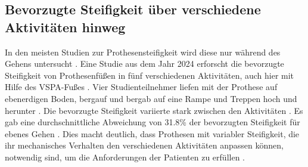 \subsection{Bevorzugte Steifigkeit über verschiedene Aktivitäten hinweg}
In den meisten Studien zur Prothesensteifigkeit wird diese nur während des Gehens untersucht \cite{Pett.2024}. Eine Studie aus dem Jahr 2024 erforscht die bevorzugte Steifigkeit von Prothesenfüßen in fünf verschiedenen Aktivitäten, auch hier mit Hilfe des VSPA-Fußes \cite{Pett.2024}. Vier Studienteilnehmer liefen mit der Prothese auf ebenerdigen Boden, bergauf und bergab auf eine Rampe und Treppen hoch und herunter \cite{Pett.2024}. Die bevorzugte Steifigkeit variierte stark zwischen den Aktivitäten \cite{Pett.2024}. Es gab eine durchschnittliche Abweichung von 31.8\% der bevorzugten Steifigkeit für ebenes Gehen \cite{Pett.2024}. Dies macht deutlich, dass Prothesen mit variabler Steifigkeit, die ihr mechanisches Verhalten den verschiedenen Aktivitäten anpassen können, notwendig sind, um die Anforderungen der Patienten zu erfüllen \cite{Pett.2024}.

